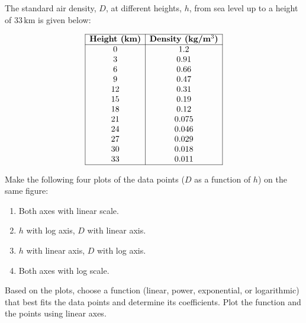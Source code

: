 \documentclass[a4paper, 12pt]{report}
\def\ni{green!60!black!40!white}
\def\link{blue!50!black}
\begin{document}
\begin{tcolorbox}[title={\color{black}\section{Q2}}, colback=white, colframe=\ni, boxrule=1mm, width=1\textwidth]
    The standard air density, \({D}\), at different heights, \({h}\), from sea level up to a height of \(33 \, \text{km}\) is given below:
    
    \[
    \begin{array}{|c|c|}
        \hline
        \textbf{Height (km)} & \textbf{Density (kg/m\(^3\))} \\ \hline
        0 & 1.2 \\ 
        3 & 0.91 \\ 
        6 & 0.66 \\ 
        9 & 0.47 \\ 
        12 & 0.31 \\ 
        15 & 0.19 \\ 
        18 & 0.12 \\ 
        21 & 0.075 \\ 
        24 & 0.046 \\ 
        27 & 0.029 \\ 
        30 & 0.018 \\ 
        33 & 0.011 \\ \hline
    \end{array}
    \]
    
    Make the following four plots of the data points (\({D}\) as a function of \({h}\)) on the same figure:
    
    \begin{enumerate}
        \item Both axes with linear scale.
        \item \({h}\) with log axis, \({D}\) with linear axis.
        \item \({h}\) with linear axis, \({D}\) with log axis.
        \item Both axes with log scale.
    \end{enumerate}
    
    Based on the plots, choose a function (linear, power, exponential, or logarithmic) that best fits the data points and determine its coefficients. Plot the function and the points using linear axes.
\end{tcolorbox}


\end{document}
